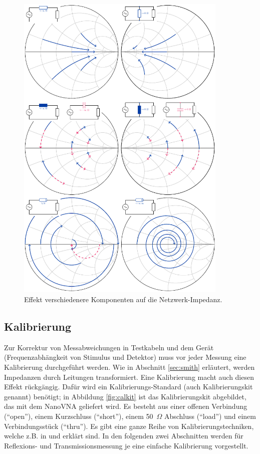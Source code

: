 \documentclass[twoside,a4paper,11pt,halfparskip,DIV=11,notitlepage]{scrartcl}
\newcommand{\Ohm}{$\Omega$\xspace}
\begin{document}
\begin{figure}
    \begin{center}\includegraphics[width=0.9\textwidth]{figures/smith_big_picture/smith_big_picture.pdf}\end{center}
    \caption{Effekt verschiedenere Komponenten auf die Netzwerk-Impedanz.}
    \label{fig:smithbigpicture}
\end{figure}

\newpage %
\subsection{Kalibrierung}\label{sec:calibration}

Zur Korrektur von Messabweichungen in Testkabeln und dem Gerät
(Frequenzabhängkeit von Stimulus und Detektor) muss vor jeder Messung eine
Kalibrierung durchgeführt werden. Wie in Abschnitt \ref{sec:smith} erläutert,
werden Impedanzen durch Leitungen transformiert. Eine Kalibrierung macht
auch diesen Effekt rückgängig. Dafür wird ein Kalibrierungs-Standard
(auch Kalibrierungskit genannt) benötigt; in Abbildung \ref{fig:calkit} ist
das Kalibrierungskit abgebildet, das mit dem NanoVNA geliefert wird. Es
besteht aus einer offenen Verbindung (``open''), einem Kurzschluss (``short''),
einem 50~\Ohm Abschluss (``load'') und einem Verbindungsstück (``thru'').
Es gibt eine ganze Reihe von Kalibrierungstechniken, welche z.B. in
\cite{hiebel2007fundamentals}  und \cite{hiebel2008vector} erklärt sind. In
den folgenden zwei Abschnitten werden für Reflexions- und Transmissionsmessung
je eine einfache Kalibrierung vorgestellt.
\end{document}
